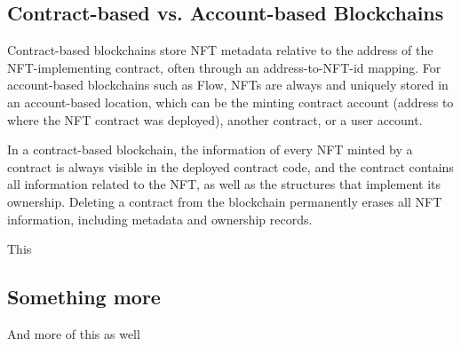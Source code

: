 \documentclass[../main.tex]{subfiles}
\begin{document}


\subsection{Contract-based vs. Account-based Blockchains}
\label{sec:contract-to-account-storage}
Contract-based blockchains store NFT metadata relative to the address of the NFT-implementing contract, often through an address-to-NFT-id mapping. For account-based blockchains such as Flow, NFTs are always and uniquely stored in an account-based location, which can be the minting contract account (address to where the NFT contract was deployed), another contract, or a user account.
\par
In a contract-based blockchain, the information of every NFT minted by a contract is always visible in the deployed contract code, and the contract contains all information related to the NFT, as well as the structures that implement its ownership. Deleting a contract from the blockchain permanently erases all NFT information, including metadata and ownership records.

This
\subsection{Something more}
And more of this as well
\end{document}
